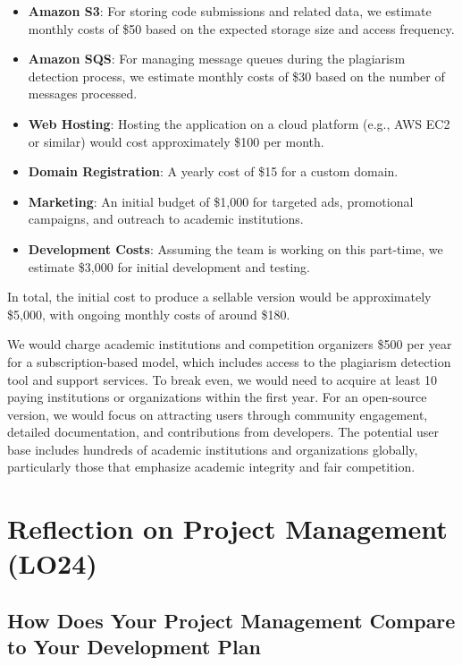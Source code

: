 \documentclass{article}
\begin{document}
\begin{itemize}
    \item \textbf{Amazon S3}: For storing code submissions and related data, we estimate monthly costs of \$50 based on the expected storage size and access frequency.
    \item \textbf{Amazon SQS}: For managing message queues during the plagiarism detection process, we estimate monthly costs of \$30 based on the number of messages processed.
    \item \textbf{Web Hosting}: Hosting the application on a cloud platform (e.g., AWS EC2 or similar) would cost approximately \$100 per month.
    \item \textbf{Domain Registration}: A yearly cost of \$15 for a custom domain.
    \item \textbf{Marketing}: An initial budget of \$1,000 for targeted ads, promotional campaigns, and outreach to academic institutions.
    \item \textbf{Development Costs}: Assuming the team is working on this part-time, we estimate \$3,000 for initial development and testing.
\end{itemize}

In total, the initial cost to produce a sellable version would be approximately \$5,000, with ongoing monthly costs of around \$180.

We would charge academic institutions and competition organizers \$500 per year for a subscription-based model, which includes access to the plagiarism detection tool and support services. To break even, we would need to acquire at least 10 paying institutions or organizations within the first year. For an open-source version, we would focus on attracting users through community engagement, detailed documentation, and contributions from developers. The potential user base includes hundreds of academic institutions and organizations globally, particularly those that emphasize academic integrity and fair competition.

\section{Reflection on Project Management (LO24)}

\subsection{How Does Your Project Management Compare to Your Development Plan}
\end{document}
